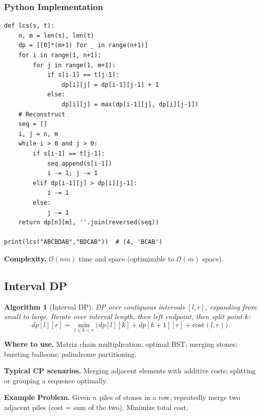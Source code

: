 \documentclass[10pt,a4paper]{article}
\theoremstyle{cpstyle}
\newtheorem{algorithm}[theorem]{Algorithm}
\newcommand{\bigO}[1]{\mathcal{O}\!\left(#1\right)}
\begin{document}
\subsubsection{Python Implementation}
\begin{lstlisting}[caption={LCS -- O(nm) DP}]
def lcs(s, t):
    n, m = len(s), len(t)
    dp = [[0]*(m+1) for _ in range(n+1)]
    for i in range(1, n+1):
        for j in range(1, m+1):
            if s[i-1] == t[j-1]:
                dp[i][j] = dp[i-1][j-1] + 1
            else:
                dp[i][j] = max(dp[i-1][j], dp[i][j-1])
    # Reconstruct
    seq = []
    i, j = n, m
    while i > 0 and j > 0:
        if s[i-1] == t[j-1]:
            seq.append(s[i-1])
            i -= 1; j -= 1
        elif dp[i-1][j] > dp[i][j-1]:
            i -= 1
        else:
            j -= 1
    return dp[n][m], ''.join(reversed(seq))

print(lcs("ABCBDAB","BDCAB"))  # (4, 'BCAB')
\end{lstlisting}

\textbf{Complexity.} $\bigO{nm}$ time and space (optimizable to $\bigO{m}$ space).

\subsection{Interval DP}

\begin{algorithm}[Interval DP]
DP over contiguous intervals $[l, r]$, expanding from small to large. Iterate over interval length, then left endpoint, then split point $k$:
\[
  dp[l][r] = \min_{l \leq k < r} \bigl(dp[l][k] + dp[k{+}1][r] + \text{cost}(l,r)\bigr).
\]
\end{algorithm}

\textbf{Where to use.} Matrix chain multiplication; optimal BST; merging stones; bursting balloons; palindrome partitioning.

\textbf{Typical CP scenarios.} Merging adjacent elements with additive costs; splitting or grouping a sequence optimally.

\textbf{Example Problem.} Given $n$ piles of stones in a row, repeatedly merge two adjacent piles (cost = sum of the two). Minimize total cost.
\end{document}
